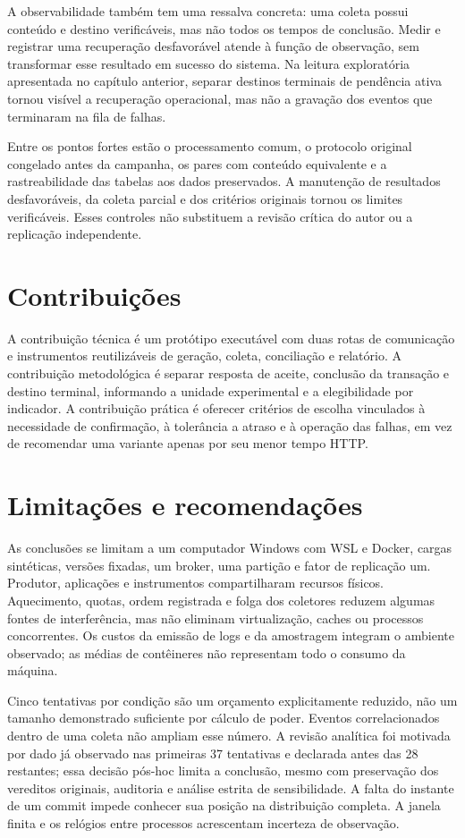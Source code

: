 A observabilidade também tem uma ressalva concreta: uma coleta possui conteúdo e destino verificáveis, mas não todos os tempos de conclusão. Medir e registrar uma recuperação desfavorável atende à função de observação, sem transformar esse resultado em sucesso do sistema. Na leitura exploratória apresentada no capítulo anterior, separar destinos terminais de pendência ativa tornou visível a recuperação operacional, mas não a gravação dos eventos que terminaram na fila de falhas.

Entre os pontos fortes estão o processamento comum, o protocolo original congelado antes da campanha, os pares com conteúdo equivalente e a rastreabilidade das tabelas aos dados preservados. A manutenção de resultados desfavoráveis, da coleta parcial e dos critérios originais tornou os limites verificáveis. Esses controles não substituem a revisão crítica do autor ou a replicação independente.

\section{Contribuições}
A contribuição técnica é um protótipo executável com duas rotas de comunicação e instrumentos reutilizáveis de geração, coleta, conciliação e relatório. A contribuição metodológica é separar resposta de aceite, conclusão da transação e destino terminal, informando a unidade experimental e a elegibilidade por indicador. A contribuição prática é oferecer critérios de escolha vinculados à necessidade de confirmação, à tolerância a atraso e à operação das falhas, em vez de recomendar uma variante apenas por seu menor tempo HTTP.

\section{Limitações e recomendações}

As conclusões se limitam a um computador Windows com WSL e Docker, cargas sintéticas, versões fixadas, um broker, uma partição e fator de replicação um. Produtor, aplicações e instrumentos compartilharam recursos físicos. Aquecimento, quotas, ordem registrada e folga dos coletores reduzem algumas fontes de interferência, mas não eliminam virtualização, caches ou processos concorrentes. Os custos da emissão de logs e da amostragem integram o ambiente observado; as médias de contêineres não representam todo o consumo da máquina.

Cinco tentativas por condição são um orçamento explicitamente reduzido, não um tamanho demonstrado suficiente por cálculo de poder. Eventos correlacionados dentro de uma coleta não ampliam esse número. A revisão analítica foi motivada por dado já observado nas primeiras 37 tentativas e declarada antes das 28 restantes; essa decisão pós-hoc limita a conclusão, mesmo com preservação dos vereditos originais, auditoria e análise estrita de sensibilidade. A falta do instante de um commit impede conhecer sua posição na distribuição completa. A janela finita e os relógios entre processos acrescentam incerteza de observação.

